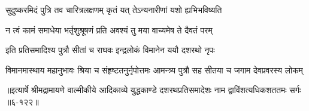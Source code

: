 \twolineshloka
{सुदुष्करमिदं पुत्रि तव चारित्रलक्षणम्}
{कृतं यत् तेऽन्यनारीणां यशो ह्यभिभविष्यति} %

\twolineshloka
{न त्वं कामं समाधेया भर्तृशुश्रूषणं प्रति}
{अवश्यं तु मया वाच्यमेष ते दैवतं परम्} %

\twolineshloka
{इति प्रतिसमादिश्य पुत्रौ सीतां च राघवः}
{इन्द्रलोकं विमानेन ययौ दशरथो नृपः} %

\twolineshloka
{विमानमास्थाय महानुभावः श्रिया च संहृष्टतनुर्नृपोत्तमः}
{आमन्त्र्य पुत्रौ सह सीतया च जगाम देवप्रवरस्य लोकम्} %


॥इत्यार्षे श्रीमद्रामायणे वाल्मीकीये आदिकाव्ये युद्धकाण्डे दशरथप्रतिसमादेशः नाम द्वाविंशत्यधिकशततमः सर्गः ॥६-१२२॥
